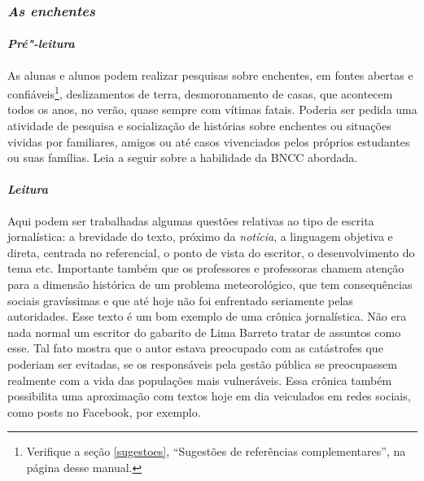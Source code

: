 \documentclass[11pt]{extarticle}
\begin{document}
\subsubsection{\textit{As enchentes}}
\paragraph{\textit{Pré"-leitura}}

As alunas e alunos podem realizar pesquisas sobre enchentes, em fontes abertas e confiáveis\footnote{Verifique 
a seção \ref{sugestoes}, ``Sugestões de referências complementares'', 
na página \pageref{sugestoes} desse manual.},
deslizamentos de terra, desmoronamento de casas, que acontecem todos os
anos, no verão, quase sempre com vítimas fatais. Poderia ser pedida uma
atividade de pesquisa e socialização de histórias sobre enchentes ou
situações vividas por familiares, amigos ou até casos vivenciados pelos
próprios estudantes ou suas famílias.
Leia a seguir sobre a habilidade da BNCC abordada.






\paragraph{\textit{Leitura}}

Aqui podem ser trabalhadas algumas questões relativas ao tipo de
escrita jornalística: a brevidade do texto, próximo da \emph{notícia}, a
linguagem objetiva e direta, centrada no referencial, o ponto de vista
do escritor, o desenvolvimento do tema etc. Importante também que os
professores e professoras chamem atenção para a dimensão histórica de um
problema meteorológico, que tem consequências sociais gravíssimas e que
até hoje não foi enfrentado seriamente pelas autoridades. Esse texto é
um bom exemplo de uma crônica jornalística. Não era nada normal um
escritor do gabarito de Lima Barreto tratar de assuntos como esse. Tal
fato mostra que o autor estava preocupado com as catástrofes que
poderiam ser evitadas, se os responsáveis pela gestão pública se
preocupassem realmente com a vida das populações mais vulneráveis. Essa
crônica também possibilita uma aproximação com textos hoje em dia
veiculados em redes sociais, como posts no Facebook, por exemplo.
\end{document}
